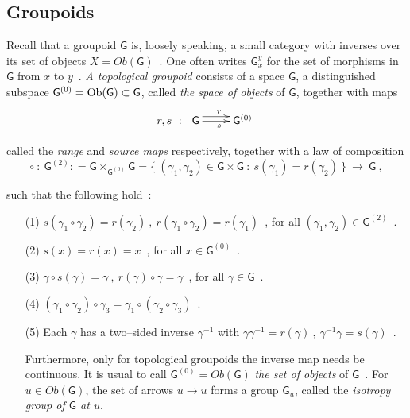 \documentclass[12pt]{article}
\theoremstyle{plain}
\theoremstyle{definition}
\numberwithin{equation}{section}
\newcommand{\grp}{{\mathsf{G}}}
\newcommand{\obg}{{\rm Ob(\mathsf{G)}}}
\newcommand{\lra}{{\longrightarrow}}
\newcommand{\<}{{\langle}}
\begin{document}
\subsection{Groupoids}

Recall that a groupoid $\grp$ is, loosely speaking, a small
category with inverses over its set of objects $X = Ob(\grp)$~. One
often writes $\grp^y_x$ for the set of morphisms in $\grp$ from
$x$ to $y$~. \emph{A topological groupoid} consists of a space
$\grp$, a distinguished subspace $\grp^{(0)} = \obg \subset \grp$,
called {\it the space of objects} of $\grp$, together with maps
\begin{equation}
r,s~:~ \xymatrix{ \grp \ar@<1ex>[r]^r \ar[r]_s & \grp^{(0)} }
\end{equation}

called the {\it range} and {\it source maps} respectively,
together with a law of composition
\begin{equation}
\circ~:~ \grp^{(2)}: = \grp \times_{\grp^{(0)}} \grp = \{
~(\gamma_1, \gamma_2) \in \grp \times \grp ~:~ s(\gamma_1) =
r(\gamma_2)~ \}~ \lra ~\grp~,
\end{equation}

such that the following hold~:~
\begin{enumerate}
\item[(1)]
$s(\gamma_1 \circ \gamma_2) = r(\gamma_2)~,~ r(\gamma_1 \circ
\gamma_2) = r(\gamma_1)$~, for all $(\gamma_1, \gamma_2) \in
\grp^{(2)}$~.

\item[(2)]
$s(x) = r(x) = x$~, for all $x \in \grp^{(0)}$~.

\item[(3)]
$\gamma \circ s(\gamma) = \gamma~,~ r(\gamma) \circ \gamma =
\gamma$~, for all $\gamma \in \grp$~.

\item[(4)]
$(\gamma_1 \circ \gamma_2) \circ \gamma_3 = \gamma_1 \circ
(\gamma_2 \circ \gamma_3)$~.

\item[(5)]
Each $\gamma$ has a two--sided inverse $\gamma^{-1}$ with $\gamma
\gamma^{-1} = r(\gamma)~,~ \gamma^{-1} \gamma = s (\gamma)$~.

Furthermore, only for topological groupoids the inverse map needs be continuous.
It is usual to call $\grp^{(0)} = Ob(\grp)$ {\it the set of objects}
of $\grp$~. For $u \in Ob(\grp)$, the set of arrows $u \lra u$ forms a
group $\grp_u$, called the \emph{isotropy group of $\grp$ at $u$}.
\end{enumerate}
\end{document}
